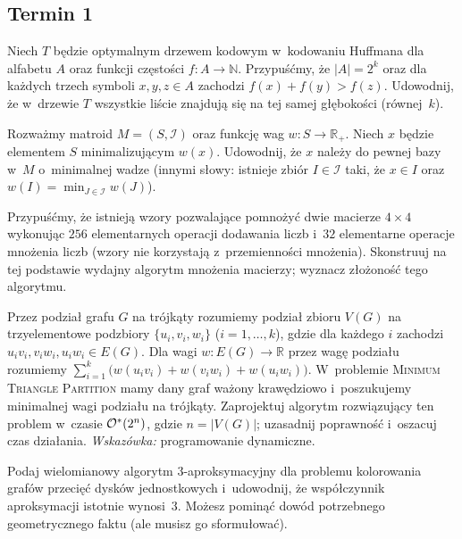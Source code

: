 \subsection{Termin 1}

\begin{zadanie}
	Niech $T$ będzie optymalnym drzewem kodowym w~kodowaniu Huffmana dla alfabetu
	$A$ oraz funkcji częstości $f:A\to\mathbb{N}$. Przypuśćmy, że $|A|=2^k$ oraz
	dla każdych trzech symboli $x,y,z\in A$ zachodzi $f(x)+f(y)>f(z)$. Udowodnij,
	że w~drzewie $T$ wszystkie liście znajdują się na tej samej głębokości
	(równej~$k$).
\end{zadanie}

\begin{zadanie}
	Rozważmy matroid $M=(S,\mathcal{I})$ oraz funkcję wag $w:S\to\mathbb{R}_+$.
	Niech $x$ będzie elementem $S$ minimalizującym $w(x)$. Udowodnij, że $x$
	należy do pewnej bazy w~$M$ o~minimalnej wadze (innymi słowy: istnieje zbiór
	$I\in\mathcal{I}$ taki, że $x\in I$ oraz $w(I)=\min_{J\in\mathcal{I}}w(J)$).
\end{zadanie}

\begin{zadanie}
	Przypuśćmy, że istnieją wzory pozwalające pomnożyć dwie macierze $4\times 4$
	wykonując $256$ elementarnych operacji dodawania liczb i~$32$ elementarne
	operacje mnożenia liczb (wzory nie korzystają z~przemienności mnożenia).
	Skonstruuj na tej podstawie wydajny algorytm mnożenia macierzy; wyznacz
	złożoność tego algorytmu.
\end{zadanie}

\begin{zadanie}
	Przez podział grafu $G$ na trójkąty rozumiemy podział zbioru $V(G)$ na
	trzyelementowe podzbiory $\{u_i,v_i,w_i\}$ ($i=1,\dots,k$), gdzie dla każdego
	$i$ zachodzi $u_iv_i,v_iw_i,u_iw_i\in E(G)$. Dla wagi $w:E(G)\to\mathbb{R}$
	przez wagę podziału rozumiemy $\sum_{i=1}^k\big(w(u_iv_i)+w(v_iw_i)+w(u_iw_i)\big)$.
	W~problemie \textsc{Minimum Triangle Partition} mamy dany graf ważony
	krawędziowo i~poszukujemy minimalnej wagi podziału na trójkąty. Zaprojektuj
	algorytm rozwiązujący ten problem w~czasie $\mathcal{O}^*(2^n)$, gdzie $n=|V(G)|$;
	uzasadnij poprawność i~oszacuj czas działania. \emph{Wskazówka:} programowanie
	dynamiczne.
\end{zadanie}

\begin{zadanie}
	Podaj wielomianowy algorytm $3$-aproksymacyjny dla problemu kolorowania grafów
	przecięć dysków jednostkowych i~udowodnij, że współczynnik aproksymacji
	istotnie wynosi~$3$. Możesz pominąć dowód potrzebnego geometrycznego faktu
	(ale musisz go sformułować).
\end{zadanie}
